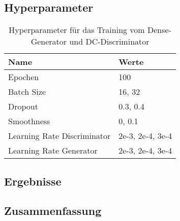\subsection{Hyperparameter}
\begin{table}[H]
	\centering
	\begin{tabular}{l l}
		Name                        & Werte            \\ \hline
		Epochen                     & 100              \\
		Batch Size                  & 16, 32           \\
		Dropout                     & 0.3, 0.4         \\
		Smoothness                  & 0, 0.1           \\
		Learning Rate Discriminator & 2e-3, 2e-4, 3e-4 \\
		Learning Rate Generator     & 2e-3, 2e-4, 3e-4
	\end{tabular}
	\caption{Hyperparameter für das Training vom Dense-Generator und DC-Discriminator}
\end{table}
\subsection{Ergebnisse}
\subsection{Zusammenfassung}
